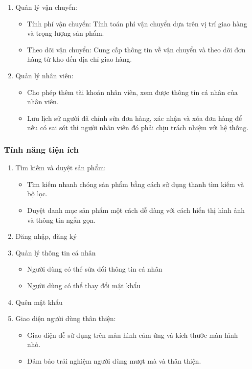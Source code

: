 \begin{enumerate}
\begin{itemize}
    \end{itemize}
    \item Quản lý vận chuyển:
    \begin{itemize}
        \item Tính phí vận chuyển: Tính toán phí vận chuyển dựa trên vị trí giao hàng và trọng lượng sản phẩm.
        \item Theo dõi vận chuyển: Cung cấp thông tin về vận chuyển và theo dõi đơn hàng từ kho đến địa chỉ giao hàng.
    \end{itemize}
    \item Quản lý nhân viên:
    \begin{itemize}
     \item Cho phép thêm tài khoản nhân viên, xem được thông tin cá nhân của nhân viên.
        \item Lưu lịch sử người đã chỉnh sửa đơn hàng, xác nhận và xóa đơn hàng để nếu có sai sót thì người nhân viên đó phải chịu trách nhiệm với hệ thống.
    \end{itemize}
\end{enumerate}
\subsubsection{Tính năng tiện ích}
\begin{enumerate}
    \item Tìm kiếm và duyệt sản phẩm:
    \begin{itemize}
        \item Tìm kiếm nhanh chóng sản phẩm bằng cách sử dụng thanh tìm kiếm và bộ lọc.
        \item Duyệt danh mục sản phẩm một cách dễ dàng với cách hiển thị hình ảnh và thông tin ngắn gọn.
    \end{itemize}
    \item Đăng nhập, đăng ký
    \item Quản lý thông tin cá nhân
    \begin{itemize}
        \item Người dùng có thể sửa đổi thông tin cá nhân
        \item Người dùng có thể thay đổi mật khẩu
    \end{itemize}
    \item Quên mật khẩu
    \item Giao diện người dùng thân thiện:
    \begin{itemize}
        \item Giao diện dễ sử dụng trên màn hình cảm ứng và kích thước màn hình nhỏ.
        \item Đảm bảo trải nghiệm người dùng mượt mà và thân thiện.
    \end{itemize}


\end{enumerate}

